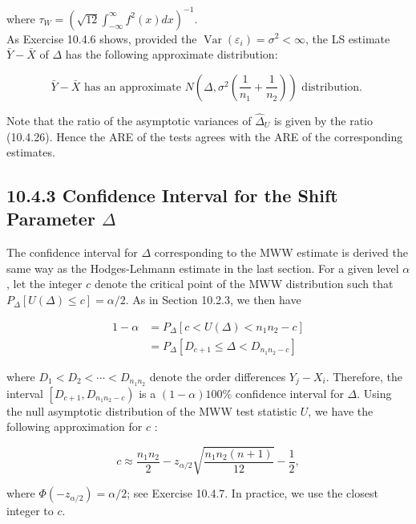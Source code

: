 where $\tau_{W}=\left(\sqrt{12} \int_{-\infty}^{\infty} f^{2}(x) d x\right)^{-1}$.\\
As Exercise 10.4.6 shows, provided the $\operatorname{Var}\left(\varepsilon_{i}\right)=\sigma^{2}<\infty$, the LS estimate $\bar{Y}-\bar{X}$ of $\Delta$ has the following approximate distribution:


\begin{equation*}
\bar{Y}-\bar{X} \text { has an approximate } N\left(\Delta, \sigma^{2}\left(\frac{1}{n_{1}}+\frac{1}{n_{2}}\right)\right) \text { distribution. } \tag{10.4.30}
\end{equation*}


Note that the ratio of the asymptotic variances of $\widehat{\Delta}_{U}$ is given by the ratio (10.4.26). Hence the ARE of the tests agrees with the ARE of the corresponding estimates.

\subsection*{10.4.3 Confidence Interval for the Shift Parameter $\Delta$}
The confidence interval for $\Delta$ corresponding to the MWW estimate is derived the same way as the Hodges-Lehmann estimate in the last section. For a given level $\alpha$, let the integer $c$ denote the critical point of the MWW distribution such that $P_{\Delta}[U(\Delta) \leq c]=\alpha / 2$. As in Section 10.2.3, we then have


\begin{align*}
1-\alpha & =P_{\Delta}\left[c<U(\Delta)<n_{1} n_{2}-c\right] \\
& =P_{\Delta}\left[D_{c+1} \leq \Delta<D_{n_{1} n_{2}-c}\right] \tag{10.4.31}
\end{align*}


where $D_{1}<D_{2}<\cdots<D_{n_{1} n_{2}}$ denote the order differences $Y_{j}-X_{i}$. Therefore, the interval $\left[D_{c+1}, D_{n_{1} n_{2}-c}\right)$ is a $(1-\alpha) 100 \%$ confidence interval for $\Delta$. Using the null asymptotic distribution of the MWW test statistic $U$, we have the following approximation for $c$ :


\begin{equation*}
c \approx \frac{n_{1} n_{2}}{2}-z_{\alpha / 2} \sqrt{\frac{n_{1} n_{2}(n+1)}{12}}-\frac{1}{2}, \tag{10.4.32}
\end{equation*}


where $\Phi\left(-z_{\alpha / 2}\right)=\alpha / 2$; see Exercise 10.4.7. In practice, we use the closest integer to $c$.

